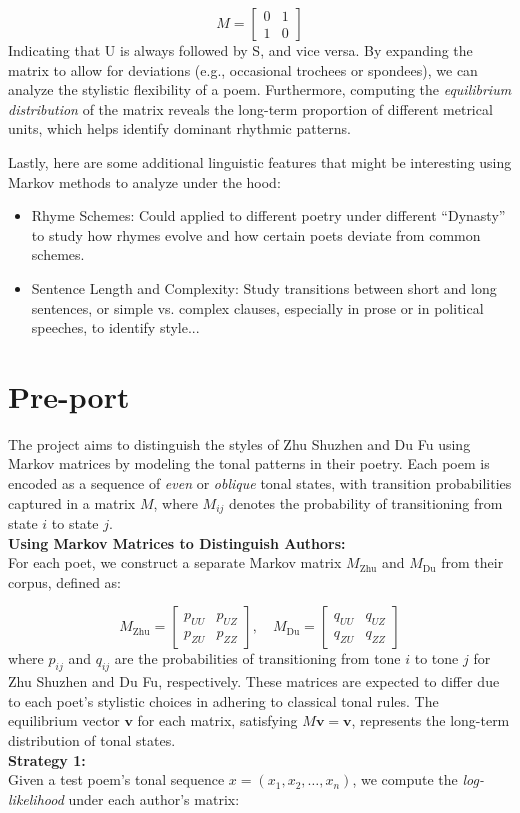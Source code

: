 \documentclass[12pt]{article}
\begin{document}
\[
    M = \begin{bmatrix} 0 & 1 \\ 1 & 0 \end{bmatrix}
\]
Indicating that U is always followed by S, and vice versa. By expanding the matrix to allow for deviations (e.g., occasional trochees or spondees), we can analyze the stylistic flexibility of a poem.
Furthermore, computing the \textit{equilibrium distribution} of the matrix reveals the long-term proportion of different metrical units, which helps identify dominant rhythmic patterns.

Lastly, here are some additional linguistic features that might be interesting using Markov methods to analyze under the hood:
\begin{itemize}
    \item Rhyme Schemes: Could applied to different poetry under different ``Dynasty'' to study how rhymes evolve and how certain poets deviate from common schemes.
    \item Sentence Length and Complexity: Study transitions between short and long sentences, or simple vs. complex clauses, especially in prose or in political speeches, to identify style...
\end{itemize}

\section{Pre-port}
The project aims to distinguish the styles of Zhu Shuzhen and Du Fu using Markov matrices by modeling the tonal patterns in their poetry. Each poem is encoded as a sequence of \textit{even} or \textit{oblique} tonal states, with transition probabilities captured in a matrix $M$, where $M_{ij}$ denotes the probability of transitioning from state $i$ to state $j$.
\\
\textbf{Using Markov Matrices to Distinguish Authors: }
\\
For each poet, we construct a separate Markov matrix $M_{\text{Zhu}}$ and $M_{\text{Du}}$ from their corpus, defined as:

\[
    M_{\text{Zhu}} = \begin{bmatrix} p_{UU} & p_{UZ} \\ p_{ZU} & p_{ZZ} \end{bmatrix}, \quad M_{\text{Du}} = \begin{bmatrix} q_{UU} & q_{UZ} \\ q_{ZU} & q_{ZZ} \end{bmatrix}
\]
where $p_{ij}$ and $q_{ij}$ are the probabilities of transitioning from tone $i$ to tone $j$ for Zhu Shuzhen and Du Fu, respectively. These matrices are expected to differ due to each poet's stylistic choices in adhering to classical tonal rules. The equilibrium vector $\mathbf{v}$ for each matrix, satisfying $M \mathbf{v} = \mathbf{v}$, represents the long-term distribution of tonal states.
\\
\textbf{Strategy 1: }
\\
Given a test poem's tonal sequence $x = (x_1, x_2, \ldots, x_n)$, we compute the \textit{log-likelihood} under each author's matrix:
\end{document}
